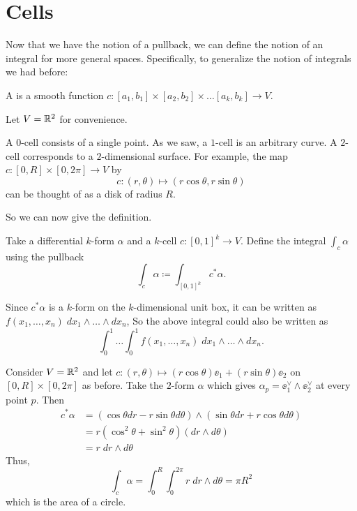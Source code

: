 \section{Cells}
Now that we have the notion of a pullback,
we can define the notion of an integral for more general spaces.
Specifically, to generalize the notion of integrals we had before:
\begin{definition}
	A  is a smooth function $c \colon [a_1, b_1] \times [a_2,b_2] \times \dots [a_k, b_k] \to V$.
\end{definition}
\begin{example}
	Let $V = \mathbb R^2$ for convenience.
	\begin{enumerate}[(a)]
		\ii A $0$-cell consists of a single point.
		\ii As we saw, a $1$-cell is an arbitrary curve.
		\ii A $2$-cell corresponds to a $2$-dimensional surface.
		For example, the map $c \colon [0,R] \times [0,2\pi] \to V$ by
		\[ c \colon (r,\theta) \mapsto (r\cos\theta, r\sin\theta) \]
		can be thought of as a disk of radius $R$.
	\end{enumerate}
\end{example}
So we can now give the definition.
\begin{definition}
	Take a differential $k$-form $\alpha$ and a $k$-cell $c \colon [0,1]^k \to V$.
	Define the integral $\int_c \alpha$ using the pullback
	\[ \int_c \alpha \coloneqq \int_{[0,1]^k} c^\ast \alpha. \]
\end{definition}
Since $c^\ast \alpha$ is a $k$-form on the $k$-dimensional unit box,
it can be written as $f(x_1, \dots, x_n) \; dx_1 \wedge \dots \wedge dx_n$,
So the above integral could also be written as
\[ \int_0^1 \dots \int_0^1 f(x_1, \dots, x_n) \; dx_1 \wedge \dots \wedge dx_n. \]

\begin{example}
	Consider $V = \mathbb R^2$ and let $c \colon (r,\theta) \mapsto (r\cos\theta)\ee_1 + (r\sin\theta)\ee_2$
	on $[0,R] \times [0,2\pi]$ as before.
	Take the $2$-form $\alpha$ which gives $\alpha_p = \ee_1^\vee \wedge \ee_2^\vee$ at every point $p$.
	Then
	\begin{align*}
		c^\ast\alpha &=
		\left( \cos\theta dr - r\sin\theta d\theta \right)
		\wedge
		\left( \sin\theta dr + r\cos\theta d\theta \right) \\
		&= r(\cos^2\theta+\sin^2\theta) (dr \wedge d\theta) \\
		&= r \; dr \wedge d\theta
	\end{align*}
	Thus,
	\[ \int_c \alpha
		= \int_0^R \int_0^{2\pi} r \; dr \wedge d\theta
		= \pi R^2 \]
	which is the area of a circle.
\end{example}


